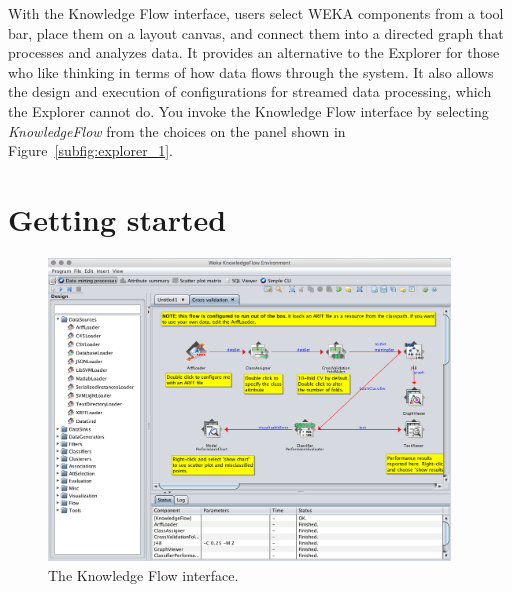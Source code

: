 With the Knowledge Flow interface, users select WEKA components from a
tool bar, place them on a layout canvas, and connect them into a
directed graph that processes and analyzes data. It provides an
alternative to the Explorer for those who like thinking in terms of
how data flows through the system. It also allows the design and
execution of configurations for streamed data processing, which the
Explorer cannot do. You invoke the Knowledge Flow interface by
selecting \textit{KnowledgeFlow} from the choices on the panel shown
in Figure~\ref{subfig:explorer_1}.

\section{Getting started}

\begin{figure}[!th]
\centering
\includegraphics[width=0.95\textwidth]{images/B3_1.png}
\caption{The Knowledge Flow interface.}
\label{fig:knowledge_flow}
\end{figure}

